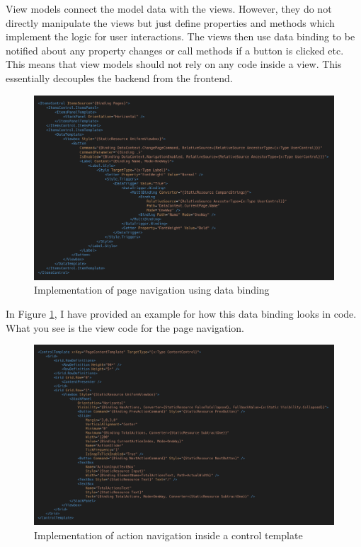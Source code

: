 View models connect the model data with the views. However, they do not directly manipulate the views but just define properties and methods which implement the logic for user interactions. The views then use data binding to be notified about any property changes or call methods if a button is clicked etc. This means that view models should not rely on any code inside a view. This essentially decouples the backend from the frontend.

\begin{figure}
\centering
\includegraphics[width=\textwidth]{figures/code/mvvm-arch/page-navigation-template.png}
\caption[Page navigation]{Implementation of page navigation using data binding}
\label{fig:mvvm.pagenavigation}
\end{figure}

In Figure \ref{fig:mvvm.pagenavigation}, I have provided an example for how this data binding looks in code. What you see is the view code for the page navigation.

\begin{figure}
\centering
\includegraphics[width=\textwidth]{figures/code/mvvm-arch/action-navigation-template.png}
\caption[Action navigation]{Implementation of action navigation inside a control template}
\label{fig:mvvm.actionnavigation}
\end{figure}

